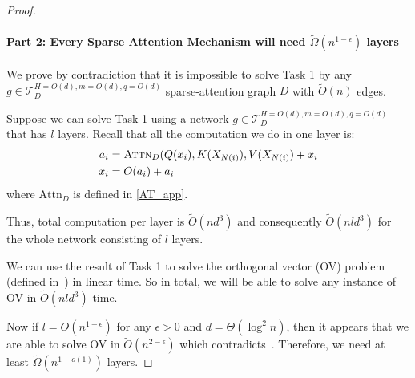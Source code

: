 \begin{proof}
\paragraph{Part 2: Every Sparse Attention Mechanism will need $\tilde{\Omega}(n^{1-\epsilon})$ layers}
    We prove by contradiction that it is impossible to solve Task 1 by any 
    $g\in\mathcal{T}_D^{H=O(d),m=O(d),q=O(d)}$ sparse-attention graph $D$ with $\tilde{O}(n)$ edges.

    Suppose we can solve Task 1 using a network $g\in\mathcal{T}_D^{H=O(d),m=O(d),q=O(d)}$ that has 
    $l$ layers. Recall that all the computation we do in one layer is:
    \begin{equation}
    \begin{aligned}
        a_i &= \textsc{Attn}_D(Q(x_i), K(X_{N(i)}), V(X_{N(i)}) + x_i \\
        x_i &= O(a_i) + a_i
    \end{aligned}
    \end{equation}
    where $\mathrm{Attn}_D$ is defined in \cref{AT_app}.

    Thus, total computation per layer is $\tilde{O}(nd^3)$ and consequently $\tilde{O}(nld^3)$ for the 
    whole network consisting of $l$ layers.
    
    We can use the result of Task 1 to solve the orthogonal vector (OV) problem (defined 
    in~) in linear time. So in total, we will be able to solve any instance of OV in $\tilde{O}(nld^3)$ time.
    
    Now if $l=O(n^{1-\epsilon})$ for any $\epsilon > 0$ and $d=\Theta(\log^2 n)$, then it 
    appears that we are able to solve OV in $\tilde{O}(n^{2-\epsilon})$ which contradicts~.
    Therefore, we need at least $\tilde{\Omega}(n^{1-o(1)})$ layers.
\end{proof}



